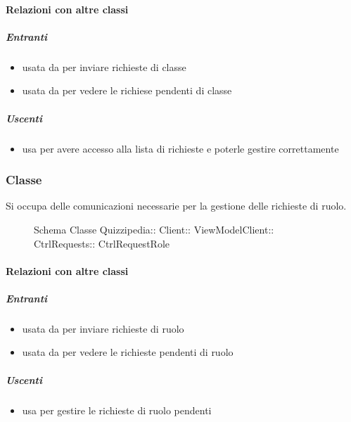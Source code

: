 \paragraph{Relazioni con altre classi}
\subparagraph{Entranti}
\begin{itemize}
\item usata da  per inviare richieste di classe
\item usata da  per vedere le richiese pendenti di classe
\end{itemize}
\subparagraph{Uscenti}
\begin{itemize}
\item usa  per avere accesso alla lista di richieste e poterle gestire correttamente
\end{itemize}
\subsubsection{Classe }
Si occupa delle comunicazioni necessarie per la gestione delle richieste di ruolo.
\begin{figure}[H]
\centering
\noindent{}
\caption[Schema Classe CtrlRequestRole]{Schema Classe Quizzipedia:: Client:: ViewModelClient:: CtrlRequests:: CtrlRequestRole}
\end{figure}
\paragraph{Relazioni con altre classi}
\subparagraph{Entranti}
\begin{itemize}
\item usata da  per inviare richieste di ruolo
\item usata da  per vedere le richieste pendenti di ruolo
\end{itemize}
\subparagraph{Uscenti}
\begin{itemize}
\item usa  per gestire le richieste di ruolo pendenti
\end{itemize}
